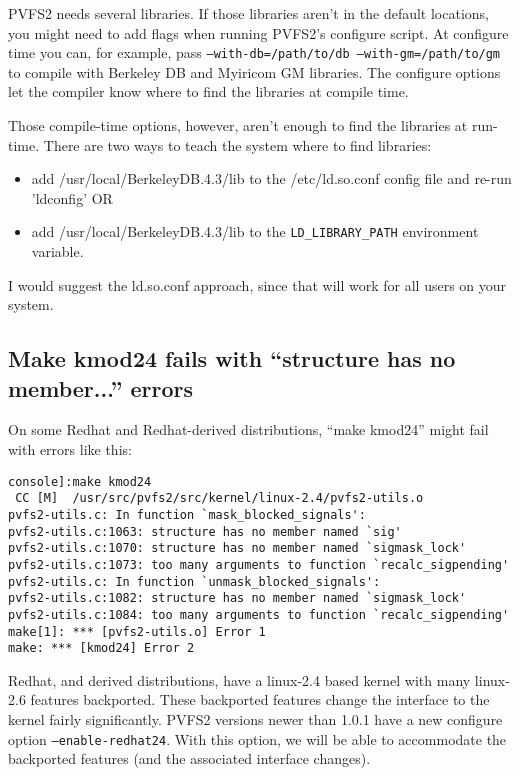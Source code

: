 \documentclass[11pt,letterpaper]{article}
\begin{document}
PVFS2 needs several libraries.  If those libraries aren't in the default
locations, you might need to add flags when running PVFS2's configure script.
At configure time you can, for example, pass \texttt{--with-db=/path/to/db
--with-gm=/path/to/gm} to compile with Berkeley DB and Myiricom GM libraries.
The configure options let the compiler know where to find the libraries at
compile time.  

Those compile-time options, however, aren't enough to find the libraries at
run-time.  There are two ways to teach the system where to find libraries:  

\begin{itemize}
\item add /usr/local/BerkeleyDB.4.3/lib to the /etc/ld.so.conf config file
  and re-run 'ldconfig' OR
\item add /usr/local/BerkeleyDB.4.3/lib to the \texttt{LD\_LIBRARY\_PATH}
    environment variable.
\end{itemize}

I would suggest the ld.so.conf approach, since that will work for all users on
your system.

\subsection{Make kmod24 fails with ``structure has no member...'' errors}

On some Redhat and Redhat-derived distributions, ``make kmod24'' might
fail with errors like this:

\begin{verbatim}
console]:make kmod24
 CC [M]  /usr/src/pvfs2/src/kernel/linux-2.4/pvfs2-utils.o
pvfs2-utils.c: In function `mask_blocked_signals':
pvfs2-utils.c:1063: structure has no member named `sig'
pvfs2-utils.c:1070: structure has no member named `sigmask_lock'
pvfs2-utils.c:1073: too many arguments to function `recalc_sigpending'
pvfs2-utils.c: In function `unmask_blocked_signals':
pvfs2-utils.c:1082: structure has no member named `sigmask_lock'
pvfs2-utils.c:1084: too many arguments to function `recalc_sigpending'
make[1]: *** [pvfs2-utils.o] Error 1
make: *** [kmod24] Error 2
\end{verbatim}

Redhat, and derived distributions, have a linux-2.4 based kernel with many
linux-2.6 features backported.  These backported features change the
interface to the kernel fairly significantly.  PVFS2 versions newer than
1.0.1 have a new configure option \texttt{--enable-redhat24}.  With this
option, we will be able to accommodate the backported features (and the
associated interface changes).
\end{document}
